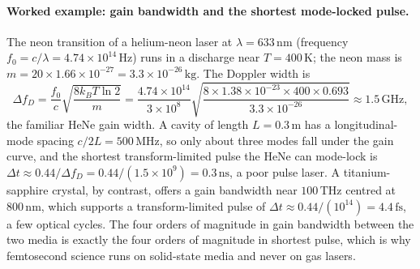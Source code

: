 \paragraph{Worked example: gain bandwidth and the shortest mode-locked pulse.} The
neon transition of a helium-neon laser at $\lambda = 633\,\si{\nano\meter}$
(frequency $f_0 = c/\lambda = 4.74\times 10^{14}\,\si{\hertz}$) runs in a discharge
near $T = 400\,\si{\kelvin}$; the neon mass is
$m = 20\times 1.66\times 10^{-27} = 3.3\times 10^{-26}\,\si{\kilogram}$. The
Doppler width is
\[
\Delta f_D = \frac{f_0}{c}\sqrt{\frac{8 k_B T\ln 2}{m}}
= \frac{4.74\times 10^{14}}{3\times 10^{8}}
\sqrt{\frac{8\times 1.38\times 10^{-23}\times 400\times 0.693}
{3.3\times 10^{-26}}} \approx 1.5\,\si{\giga\hertz},
\]
the familiar HeNe gain width. A cavity of length $L = 0.3\,\si{\meter}$ has a
longitudinal-mode spacing $c/2L = 500\,\si{\mega\hertz}$, so only about three modes
fall under the gain curve, and the shortest transform-limited pulse the HeNe can
mode-lock is $\Delta t \approx 0.44/\Delta f_D = 0.44/(1.5\times 10^{9}) =
0.3\,\si{\nano\second}$, a poor pulse laser. A titanium-sapphire crystal, by
contrast, offers a gain bandwidth near $100\,\si{\tera\hertz}$ centred at
$800\,\si{\nano\meter}$, which supports a transform-limited pulse of
$\Delta t \approx 0.44/(10^{14}) = 4.4\,\si{\femto\second}$, a few optical cycles.
The four orders of magnitude in gain bandwidth between the two media is exactly the
four orders of magnitude in shortest pulse, which is why femtosecond science runs
on solid-state media and never on gas lasers.

